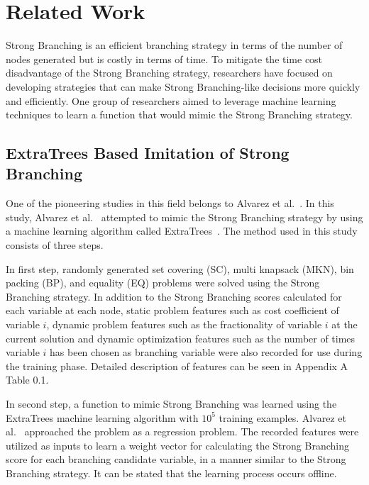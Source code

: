\section{Related Work}\label{sec:relatedWork}

Strong Branching is an efficient branching strategy in terms of the number of nodes generated but is costly in terms of time.
To mitigate the time cost disadvantage of the Strong Branching strategy, researchers have focused on developing strategies that can make Strong Branching-like decisions more quickly and efficiently.
One group of researchers aimed to leverage machine learning techniques to learn a function that would mimic the Strong Branching strategy.


\subsection{ExtraTrees Based Imitation of Strong Branching}\label{subsec:extratrees-based-imitation-of-strong-branching}
One of the pioneering studies in this field belongs to Alvarez et al.~\cite{alvarezMachineLearningBasedApproximation2017}.
In this study, Alvarez et al.~\cite{alvarezMachineLearningBasedApproximation2017} attempted to mimic the Strong Branching strategy by using a machine learning algorithm called ExtraTrees~\cite{geurtsExtremelyRandomizedTrees2006}.
The method used in this study consists of three steps.


In first step, randomly generated set covering (SC), multi knapsack (MKN), bin packing (BP), and equality (EQ) problems were solved using the Strong Branching strategy.
In addition to the Strong Branching scores calculated for each variable at each node, static problem features such as cost coefficient of variable $i$, dynamic problem features such as the fractionality of variable $i$ at the current solution and dynamic optimization features such as the number of times variable $i$ has been chosen as branching variable were also recorded for use during the training phase.
Detailed description of features can be seen in Appendix A Table 0.1. %


In second step, a function to mimic Strong Branching was learned using the ExtraTrees machine learning algorithm with $10^5$ training examples.
Alvarez et al.~\cite{alvarezMachineLearningBasedApproximation2017} approached the problem as a regression problem.
The recorded features were utilized as inputs to learn a weight vector for calculating the Strong Branching score for each branching candidate variable, in a manner similar to the Strong Branching strategy.
It can be stated that the learning process occurs offline.


